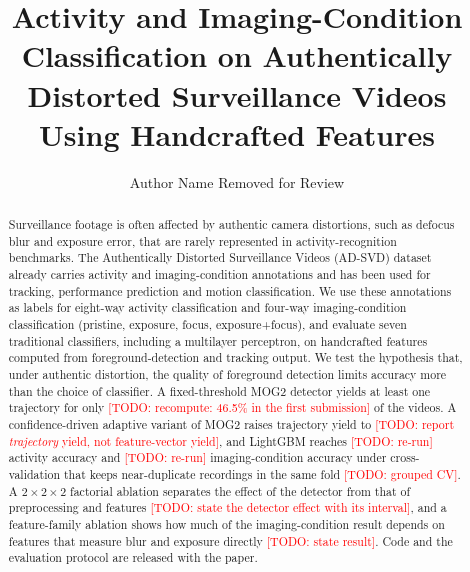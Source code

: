 \documentclass[runningheads]{llncs}
\newcommand{\todo}[1]{\textcolor{red}{[TODO: #1]}}
\begin{document}
\title{Activity and Imaging-Condition Classification on Authentically
Distorted Surveillance Videos Using Handcrafted Features}


\author{Author Name Removed for Review}

\maketitle

\begin{abstract}
Surveillance footage is often affected by authentic camera distortions, such as
defocus blur and exposure error, that are rarely represented in activity-recognition
benchmarks. The Authentically Distorted Surveillance Videos (AD-SVD) dataset already
carries activity and imaging-condition annotations and has been used for tracking,
performance prediction and motion classification. We use these annotations as labels for
eight-way activity classification and four-way imaging-condition classification (pristine,
exposure, focus, exposure+focus), and evaluate seven traditional classifiers, including a
multilayer perceptron, on handcrafted features computed from foreground-detection and
tracking output. We test the hypothesis that, under authentic distortion, the quality of
foreground detection limits accuracy more than the choice of classifier. A fixed-threshold
MOG2 detector yields at least one trajectory for only \todo{recompute: 46.5\% in the
first submission} of the videos. A confidence-driven adaptive variant of MOG2 raises
trajectory yield to \todo{report \emph{trajectory} yield, not feature-vector yield}, and
LightGBM reaches \todo{re-run} activity accuracy and \todo{re-run} imaging-condition
accuracy under cross-validation that keeps near-duplicate recordings in the same fold
\todo{grouped CV}. A $2{\times}2{\times}2$ factorial ablation separates the effect of
the detector from that of preprocessing and features \todo{state the detector effect with
its interval}, and a feature-family ablation shows how much of the imaging-condition
result depends on features that measure blur and exposure directly
\todo{state result}. Code and the evaluation protocol are released with the paper.
\end{abstract}



\end{document}
